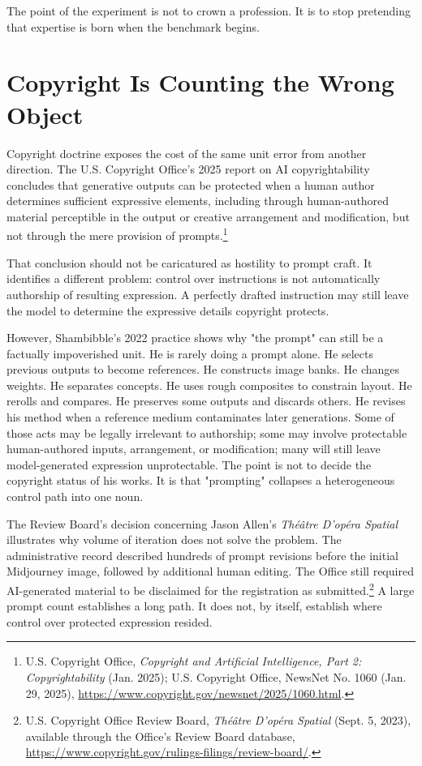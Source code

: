 \documentclass[11pt]{article}
\begin{document}
The point of the experiment is not to crown a profession. It is to stop pretending that expertise is born when the benchmark begins.

\section{Copyright Is Counting the Wrong Object}

Copyright doctrine exposes the cost of the same unit error from another direction. The U.S. Copyright Office's 2025 report on AI copyrightability concludes that generative outputs can be protected when a human author determines sufficient expressive elements, including through human-authored material perceptible in the output or creative arrangement and modification, but not through the mere provision of prompts.\footnote{U.S. Copyright Office, \textit{Copyright and Artificial Intelligence, Part 2: Copyrightability} (Jan. 2025); U.S. Copyright Office, NewsNet No. 1060 (Jan. 29, 2025), \url{https://www.copyright.gov/newsnet/2025/1060.html}.}

That conclusion should not be caricatured as hostility to prompt craft. It identifies a different problem: control over instructions is not automatically authorship of resulting expression. A perfectly drafted instruction may still leave the model to determine the expressive details copyright protects.

However, Shambibble's 2022 practice shows why "the prompt" can still be a factually impoverished unit. He is rarely doing a prompt alone. He selects previous outputs to become references. He constructs image banks. He changes weights. He separates concepts. He uses rough composites to constrain layout. He rerolls and compares. He preserves some outputs and discards others. He revises his method when a reference medium contaminates later generations. Some of those acts may be legally irrelevant to authorship; some may involve protectable human-authored inputs, arrangement, or modification; many will still leave model-generated expression unprotectable. The point is not to decide the copyright status of his works. It is that "prompting" collapses a heterogeneous control path into one noun.

The Review Board's decision concerning Jason Allen's \textit{Th\'e\^atre D'op\'era Spatial} illustrates why volume of iteration does not solve the problem. The administrative record described hundreds of prompt revisions before the initial Midjourney image, followed by additional human editing. The Office still required AI-generated material to be disclaimed for the registration as submitted.\footnote{U.S. Copyright Office Review Board, \textit{Th\'e\^atre D'op\'era Spatial} (Sept. 5, 2023), available through the Office's Review Board database, \url{https://www.copyright.gov/rulings-filings/review-board/}.} A large prompt count establishes a long path. It does not, by itself, establish where control over protected expression resided.
\end{document}
